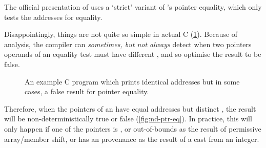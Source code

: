 The official presentation of  uses a `strict' variant of
's pointer equality, which only tests the addresses for
equality.

Disappointingly, things are not quite so simple in actual C
(\cref{fig:nd-ptr-eq-example}). Because of  analysis, the
compiler can \emph{sometimes, but not always} detect when two pointers operands
of an equality test must have different , and so optimise the
result to be false.

\begin{figure}
    \caption{An example C program which prints identical addresses but
        in some cases, a false result for pointer equality.}\label{fig:nd-ptr-eq-example}
\end{figure}

Therefore, when the pointers of an \cinline{==} have equal addresses but
distinct , the result will be non-deterministically true or
false (\cref{fig:nd-ptr-eq}). In practice, this will only happen if one of the
pointers is , or out-of-bounds as the result of permissive
array/member shift, or has an  provenance as the result of a
cast from an integer.

